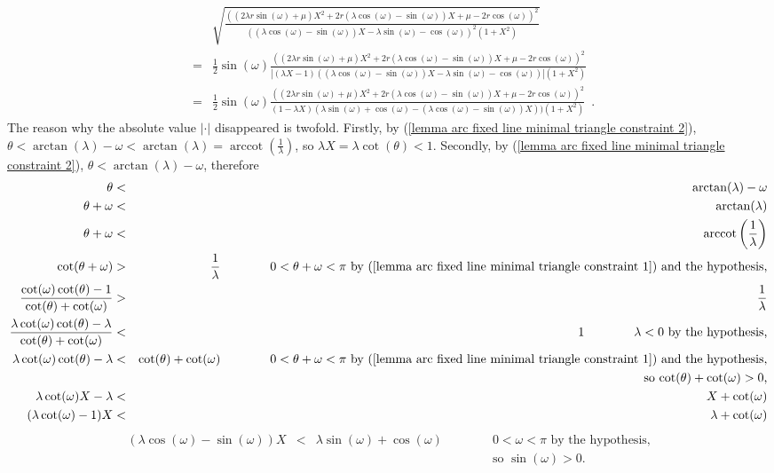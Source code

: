 \documentclass[11pt, oneside]{article}
\DeclareMathOperator{\arccot}{arccot}
\begin{document}
\begin{enumerate}
\begin{eqnarray*}
&&\sqrt{\frac{((2\lambda r\sin(\omega)+\mu)X^2+2r(\lambda\cos(\omega)-\sin(\omega))X+\mu-2r\cos(\omega))^2}{((\lambda\cos(\omega)-\sin(\omega))X-\lambda\sin(\omega)-\cos(\omega))^2(1+X^2)}}\\
&=&\frac{1}{2}\sin(\omega)\frac{((2\lambda r\sin(\omega)+\mu)X^2+2r(\lambda\cos(\omega)-\sin(\omega))X+\mu-2r\cos(\omega))^2}{\left|(\lambda X-1)((\lambda\cos(\omega)-\sin(\omega))X-\lambda\sin(\omega)-\cos(\omega))\right|(1+X^2)}\\
&=&\frac{1}{2}\sin(\omega)\frac{((2\lambda r\sin(\omega)+\mu)X^2+2r(\lambda\cos(\omega)-\sin(\omega))X+\mu-2r\cos(\omega))^2}{(1-\lambda X)(\lambda\sin(\omega)+\cos(\omega)-(\lambda\cos(\omega)-\sin(\omega))X))(1+X^2)} \enspace.
\end{eqnarray*}
The reason why the absolute value $|\cdot|$ disappeared
is twofold.
Firstly,
by (\ref{lemma arc fixed line minimal triangle constraint 2}),
$\theta < \arctan(\lambda)-\omega < \arctan(\lambda) = \arccot\left(\frac{1}{\lambda}\right)$,
so $\lambda X=\lambda \cot(\theta) < 1$.
Secondly,
by (\ref{lemma arc fixed line minimal triangle constraint 2}),
$\theta < \arctan(\lambda)-\omega$,
therefore
\begin{eqnarray*}
\theta &<& \arctan(\lambda)-\omega \\
\theta +\omega &<& \arctan(\lambda) \\
\theta +\omega &<& \arccot\left(\frac{1}{\lambda}\right) \\
\cot(\theta +\omega) &>& \frac{1}{\lambda} \qquad\qquad\textrm{$0<\theta+\omega<\pi$ by (\ref{lemma arc fixed line minimal triangle constraint 1}) and the hypothesis,} \\
\frac{\cot(\omega)\cot(\theta)-1}{\cot(\theta)+\cot(\omega)} &>& \frac{1}{\lambda} \\
\frac{\lambda\cot(\omega)\cot(\theta)-\lambda}{\cot(\theta)+\cot(\omega)} &<& 1 \qquad\qquad\textrm{$\lambda<0$ by the hypothesis,}\\
\lambda\cot(\omega)\cot(\theta)-\lambda &<& \cot(\theta)+\cot(\omega) \qquad\qquad\textrm{$0<\theta+\omega<\pi$ by (\ref{lemma arc fixed line minimal triangle constraint 1}) and the hypothesis,}\\
\phantom{\lambda\cot(\omega)\cot(\theta)-\lambda} && \phantom{\cot(\theta)+\cot(\omega)}\qquad\qquad\textrm{so $\cot(\theta)+\cot(\omega)>0$,}\\
\lambda\cot(\omega)X-\lambda &<& X+\cot(\omega)\\
(\lambda\cot(\omega)-1)X &<& \lambda+\cot(\omega)
\end{eqnarray*}
\begin{eqnarray*}
(\lambda\cos(\omega)-\sin(\omega))X &<& \lambda\sin(\omega)+\cos(\omega) \qquad\qquad\textrm{$0<\omega<\pi$ by the hypothesis,}\\
\phantom{(\lambda\cos(\omega)-\sin(\omega))X} && \phantom{\lambda\sin(\omega)+\cos(\omega)}\qquad\qquad\textrm{so $\sin(\omega)>0$.}
\end{eqnarray*}


\end{enumerate}
\end{document}
